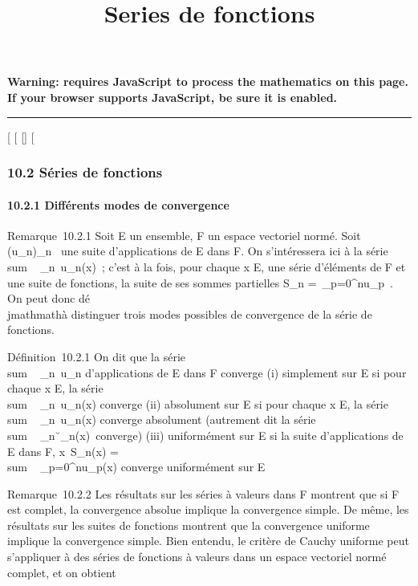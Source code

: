 \documentclass[]{article}
\title{Series de fonctions}
\author{}
\date{}
\begin{document}
\maketitle

\textbf{Warning: 
requires JavaScript to process the mathematics on this page.\\ If your
browser supports JavaScript, be sure it is enabled.}

\begin{center}\rule{3in}{0.4pt}\end{center}

{[}
{[}
{[}{]}
{[}

\subsubsection{10.2 Séries de fonctions}

\paragraph{10.2.1 Différents modes de convergence}

Remarque~10.2.1 Soit E un ensemble, F un espace vectoriel normé. Soit
(u_n)_n\in{}~ une suite d'applications de E dans F. On
s'intéressera ici à la série
\\sum ~
_n\in{}~u_n(x)~; c'est à la fois, pour chaque x \in E, une
série d'éléments de F et une suite de fonctions, la suite de ses sommes
partielles S_n =\
\sum  _p=0^nu_p~. On peut
donc dé\\jmathmathà distinguer trois modes possibles de convergence de la série de
fonctions.

Définition~10.2.1 On dit que la série
\\sum ~
_n\in{}~u_n d'applications de E dans F converge (i)
simplement sur E si pour chaque x \in E, la série
\\sum ~
_n\in{}~u_n(x) converge (ii) absolument sur E si pour chaque
x \in E, la série \\sum ~
_n\in{}~u_n(x) converge absolument (autrement dit la série
\\sum ~
_n\in{}~\u_n(x)\
converge) (iii) uniformément sur E si la suite d'applications de E dans
F, x\mapsto~S_n(x)
= \\sum ~
_p=0^nu_p(x) converge uniformément sur E

Remarque~10.2.2 Les résultats sur les séries à valeurs dans F montrent
que si F est complet, la convergence absolue implique la convergence
simple. De même, les résultats sur les suites de fonctions montrent que
la convergence uniforme implique la convergence simple. Bien entendu, le
critère de Cauchy uniforme peut s'appliquer à des séries de fonctions à
valeurs dans un espace vectoriel normé complet, et on obtient
\end{document}
